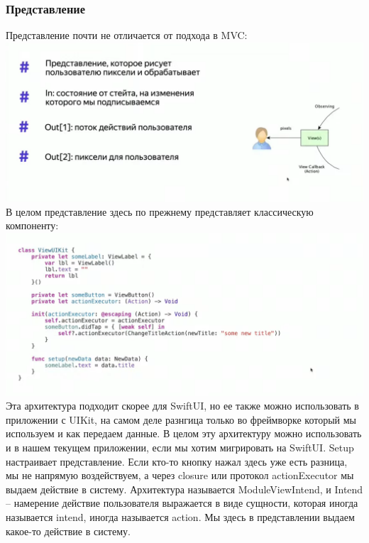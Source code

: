 \documentclass{article}
\begin{document}
    \subsubsection{Представление}
    Представление почти не отличается от подхода в MVC: 
    \newline
    \includegraphics[scale = 0.5]{pic/Снимок экрана 2023-07-30 в 21.47.49.png}
    \newline
    В целом представление здесь по прежнему представляет классическую компоненту:
    \newline
    \includegraphics[scale = 0.2]{pic/Снимок экрана 2023-07-30 в 21.48.52.png}
    \newline
    Эта архитектура подходит скорее для SwiftUI, но ее также можно использовать в приложении с UIKit, на самом деле разнгица только во фреймворке который мы используем и как передаем данные. В целом эту архитектуру можно использовать и в нашем текущем приложении, если мы хотим мигрировать на SwiftUI.
    \newline
    Setup настраивает представление. Если кто-то кнопку нажал здесь уже есть разница, мы не напрямую воздействуем, а через closure или протокол actionExecutor мы выдаем действие в систему. Архитектура называется ModuleViewIntend, и Intend -- намерение действие пользователя выражается в виде сущности, которая иногда называется intend, иногда называется action. Мы здесь в представлении выдаем какое-то действие в систему. 
\end{document}
